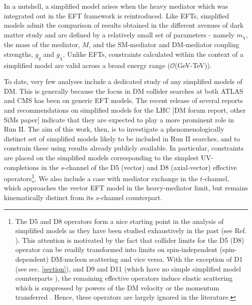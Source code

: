 \begin{flushleft}
In a nutshell, a simplified model arises when the heavy mediator which was integrated out in the EFT framework is reintroduced. Like EFTs, simplified models admit the comparison of results obtained in the different avenues of dark matter study \cite{} and are defined by a relatively small set of parameters - namely $m_\chi$, the mass of the mediator, $M$, and the SM-mediator and DM-mediator coupling strengths, $g_{q}$ and $g_\chi$. Unlike EFTs, constraints calculated within the context of a simplified model are valid across a broad energy range ($\mathcal{O}$(GeV-TeV)).
\bigskip

To date, very few analyses include a dedicated study of any simplified models of DM. This is generally because the focus in DM collider searches at both ATLAS and CMS has been on generic EFT models. The recent release of several reports and recommendations on simplified models for the LHC $[$DM forum report, other SiMs paper$]$ indicate that they are expected to play a more prominent role in Run II. The aim of this work, then, is to investigate a phenomenologically distinct set of simplified models likely to be included in Run II searches, and to constrain these using results already publicly available. In particular, constraints are placed on the simplified models corresponding to the simplest UV-completions in the $s$-channel of the D5 (vector) and D8 (axial-vector) effective operators\footnote{The D5 and D8 operators form a nice starting point in the analysis of simplified models as they have been studied exhaustively in the past (see Ref. \cite{}). This attention is motivated by the fact that collider limits for the D5 (D8) operator can be readily transformed into limits on spin-independent (spin-dependent) DM-nucleon scattering and vice versa. With the exception of D1 (see sec. \ref{section}), and D9 and D11 (which have no simple simplified model counterparts \cite{}), the remaining effective operators induce elastic scattering which is suppressed by powers of the DM velocity or the momentum transferred \cite{Kumar}. Hence, these operators are largely ignored in the literature.}. We also include a case with mediator exchange in the $t$-channel, which approaches the vector EFT model in the heavy-mediator limit, but remains kinematically distinct from its $s$-channel counterpart.

\end{flushleft}
